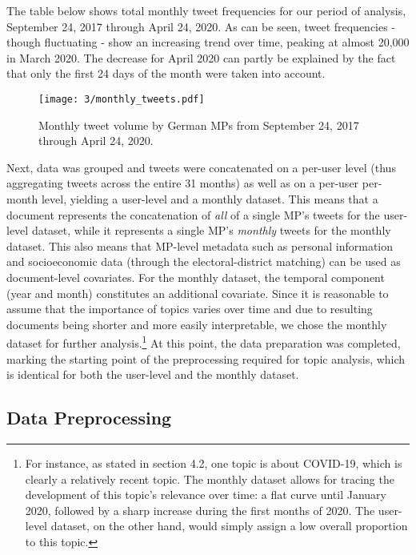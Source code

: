 \documentclass[12pt]{article}
\begin{document}
The table below shows total monthly tweet frequencies for our period of analysis, September 24, 2017 through April 24, 2020. As can be seen, tweet frequencies - though fluctuating - show an increasing trend over time, peaking at almost 20,000 in March 2020. The decrease for April 2020 can partly be explained by the fact that only the first 24 days of the month were taken into account.

\begin{figure}[h!]
  \centering
  \captionsetup{justification=centering,margin=2cm}
  \texttt{[image: 3/monthly\_tweets.pdf]}
  \caption{Monthly tweet volume by German MPs from September 24, 2017 through April 24, 2020.}
  \label{fig:monthly_tweets}
\end{figure}

Next, data was grouped and tweets were concatenated on a per-user level (thus aggregating tweets across the entire 31 months) as well as on a per-user per-month level, yielding a user-level and a monthly dataset. This means that a document represents the concatenation of \textit{all} of a single MP's tweets for the user-level dataset, while it represents a single MP's \textit{monthly} tweets for the monthly dataset. This also means that MP-level metadata such as personal information and socioeconomic data (through the electoral-district matching) can be used as document-level covariates. For the monthly dataset, the temporal component (year and month) constitutes an additional covariate. Since it is reasonable to assume that the importance of topics varies over time and due to resulting documents being shorter and more easily interpretable, we chose the monthly dataset for further analysis.\footnote{For instance, as stated in section 4.2, one topic is about COVID-19, which is clearly a relatively recent topic. The monthly dataset allows for tracing the development of this topic's relevance over time: a flat curve until January 2020, followed by a sharp increase during the first months of 2020. The user-level dataset, on the other hand, would simply assign a low overall proportion to this topic.} At this point, the data preparation was completed, marking the starting point of the preprocessing required for topic analysis, which is identical for both the user-level and the monthly dataset.

\subsection{Data Preprocessing}
\end{document}
